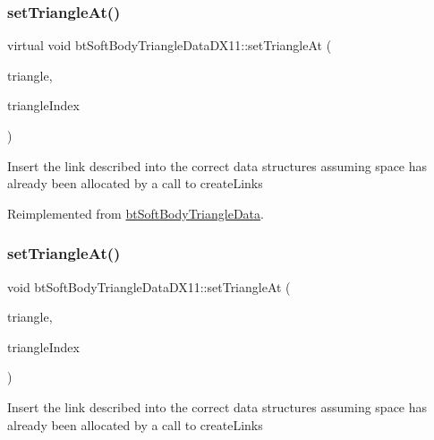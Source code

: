 \subsubsection{\texorpdfstring{set\+Triangle\+At()}{setTriangleAt()}\hspace{0.1cm}{\footnotesize\ttfamily [1/2]}}
{\footnotesize\ttfamily virtual void bt\+Soft\+Body\+Triangle\+Data\+D\+X11\+::set\+Triangle\+At (\begin{DoxyParamCaption}\item[{const \hyperlink{classbtSoftBodyTriangleData_1_1TriangleDescription}{bt\+Soft\+Body\+Triangle\+Data\+::\+Triangle\+Description} \&}]{triangle,  }\item[{int}]{triangle\+Index }\end{DoxyParamCaption})\hspace{0.3cm}{\ttfamily [virtual]}}

Insert the link described into the correct data structures assuming space has already been allocated by a call to create\+Links 

Reimplemented from \hyperlink{classbtSoftBodyTriangleData}{bt\+Soft\+Body\+Triangle\+Data}.

\mbox{\label{classbtSoftBodyTriangleDataDX11_a134859f4ca5a7c32109b06651e8939a8}} 
\subsubsection{\texorpdfstring{set\+Triangle\+At()}{setTriangleAt()}\hspace{0.1cm}{\footnotesize\ttfamily [2/2]}}
{\footnotesize\ttfamily void bt\+Soft\+Body\+Triangle\+Data\+D\+X11\+::set\+Triangle\+At (\begin{DoxyParamCaption}\item[{const \hyperlink{classbtSoftBodyTriangleData_1_1TriangleDescription}{bt\+Soft\+Body\+Triangle\+Data\+::\+Triangle\+Description} \&}]{triangle,  }\item[{int}]{triangle\+Index }\end{DoxyParamCaption})\hspace{0.3cm}{\ttfamily [virtual]}}

Insert the link described into the correct data structures assuming space has already been allocated by a call to create\+Links 

